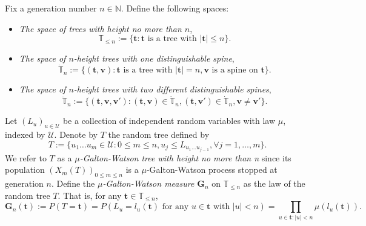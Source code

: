 \documentclass[12pt,a4paper]{amsart}
\numberwithin{equation}{section}
\begin{document}
	Fix a generation number $n\in \mathbb N$. Define the following spaces:
\begin{itemize}
\item
	\emph{The space of trees with height no more than $n$},
\begin{equation*}
		\mathbb T_{\leq n}
	:=\{ \mathbf t : \mathbf t \text{ is a tree with }| \mathbf t | \leq n\}.
\end{equation*}
\item
	\emph {The space of $n$-height trees with one distinguishable spine},
\begin{equation*}
		\dot{\mathbb T}_n
	:=\{( \mathbf t , \mathbf v): \mathbf t  \text{ is a tree with } | \mathbf t |=n,  \mathbf v \text{ is a spine on }  \mathbf t \}.
\end{equation*}
\item
	\emph{The space of $n$-height trees with two different distinguishable spines},
\begin{equation*}
		\ddot{\mathbb T}_n
	:=\{( \mathbf t , \mathbf v, \mathbf v'):( \mathbf t , \mathbf v)\in\dot{\mathbb T}_n,( \mathbf t , \mathbf v')\in\dot{\mathbb T}_n, \mathbf v\neq \mathbf v'\}.
\end{equation*}
\end{itemize}

	Let $(L_u)_{u\in\mathcal U}$ be a collection of independent random variables with law $\mu$, indexed by $\mathcal U$.
	Denote by $T$ the random tree defined by
\begin{equation*}
		T
	:=\{u_1\dots u_m\in \mathcal U: 0\le m\le n, u_j\leq L_{u_1\dots u_{j-1}},\forall j=1,\dots,m\}.
\end{equation*}
	We refer to $T$ as a \emph{$\mu$-Galton-Watson tree with height no more than n} since its population $(X_m(T))_{0\le m\le n}$ is a $\mu$-Galton-Watson process stopped at generation $n$.
	Define the \emph{$\mu$-Galton-Watson measure $\mathbf G_n$} on $\mathbb T_{\leq n}$ as the law of the random tree $T$.
	That is, for any $ \mathbf t \in\mathbb T_{\leq n}$,
\begin{equation*}
		\mathbf G_n( \mathbf t )
    :=P(T= \mathbf t )
	=P(L_u=l_u( \mathbf t )\text{ for any } u\in \mathbf t  \text{ with }|u|<n)
	=\prod_{u\in  \mathbf t :|u|<n}\mu(l_u( \mathbf t )).
\end{equation*}
\end{document}
